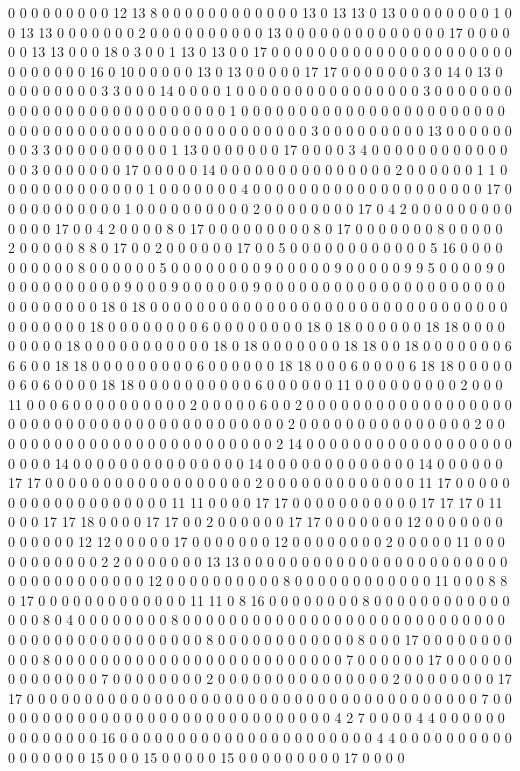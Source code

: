 0 0 0 0 0 0 0 0 0 12 13 8 0 0 0 0 0 0 0 0 0 0 0 0 13 0 13 13 0 13 0 0 0 0 0 0 0 0 1 0 0 13 13 0 0 0 0 0 0 0 2 0 0 0 0 0 0 0 0 0 0 13 0 0 0 0 0 0 0 0 0 0 0 0 0 0 17 0 0 0 0 0 0 13 13 0 0 0 18 0 3 0 0 1 13 0 13 0 0 17 0 0 0 0 0 0 0 0 0 0 0 0 0 0 0 0 0 0 0 0 0 0 0 0 0 0 0 0 16 0 10 0 0 0 0 0 13 0 13 0 0 0 0 0 17 17 0 0 0 0 0 0 0 3 0 14 0 13 0 0 0 0 0 0 0 0 0 3 3 0 0 0 14 0 0 0 0 1 0 0 0 0 0 0 0 0 0 0 0 0 0 0 0 0 3 0 0 0 0 0 0 0 0 0 0 0 0 0 0 0 0 0 0 0 0 0 0 0 0 0 0 1 0 0 0 0 0 0 0 0 0 0 0 0 0 0 0 0 0 0 0 0 0 0 0 0 0 0 0 0 0 0 0 0 0 0 0 0 0 0 0 0 0 0 0 0 0 0 0 0 0 3 0 0 0 0 0 0 0 0 0 13 0 0 0 0 0 0 0 0 3 3 0 0 0 0 0 0 0 0 0 0 1 13 0 0 0 0 0 0 0 17 0 0 0 0 3 4 0 0 0 0 0 0 0 0 0 0 0 0 0 0 3 0 0 0 0 0 0 0 17 0 0 0 0 0 14 0 0 0 0 0 0 0 0 0 0 0 0 0 0 0 2 0 0 0 0 0 0 1 1 0 0 0 0 0 0 0 0 0 0 0 0 0 1 0 0 0 0 0 0 0 4 0 0 0 0 0 0 0 0 0 0 0 0 0 0 0 0 0 0 0 0 17 0 0 0 0 0 0 0 0 0 0 0 1 0 0 0 0 0 0 0 0 0 0 2 0 0 0 0 0 0 0 0 17 0 4 2 0 0 0 0 0 0 0 0 0 0 0 0 0 17 0 0 4 2 0 0 0 0 8 0 17 0 0 0 0 0 0 0 0 0 8 0 17 0 0 0 0 0 0 0 8 0 0 0 0 0 2 0 0 0 0 0 8 8 0 17 0 0 2 0 0 0 0 0 0 17 0 0 5 0 0 0 0 0 0 0 0 0 0 0 0 5 16 0 0 0 0 0 0 0 0 0 0 8 0 0 0 0 0 0 5 0 0 0 0 0 0 0 0 9 0 0 0 0 0 9 0 0 0 0 0 9 9 5 0 0 0 0 9 0 0 0 0 0 0 0 0 0 0 0 9 0 0 0 9 0 0 0 0 0 0 9 0 0 0 0 0 0 0 0 0 0 0 0 0 0 0 0 0 0 0 0 0 0 0 0 0 0 0 0 0 18 0 18 0 0 0 0 0 0 0 0 0 0 0 0 0 0 0 0 0 0 0 0 0 0 0 0 0 0 0 0 0 0 0 0 0 0 0 0 0 0 18 0 0 0 0 0 0 0 0 6 0 0 0 0 0 0 0 0 18 0 18 0 0 0 0 0 0 18 18 0 0 0 0 0 0 0 0 0 18 0 0 0 0 0 0 0 0 0 0 0 18 0 18 0 0 0 0 0 0 0 18 18 0 0 18 0 0 0 0 0 0 0 6 6 6 0 0 18 18 0 0 0 0 0 0 0 0 0 6 0 0 0 0 0 0 18 18 0 0 0 6 0 0 0 0 6 18 18 0 0 0 0 0 0 6 0 6 0 0 0 0 18 18 0 0 0 0 0 0 0 0 0 0 6 0 0 0 0 0 0 11 0 0 0 0 0 0 0 0 0 2 0 0 0 11 0 0 0 6 0 0 0 0 0 0 0 0 0 0 2 0 0 0 0 0 6 0 0 2 0 0 0 0 0 0 0 0 0 0 0 0 0 0 0 0 0 0 0 0 0 0 0 0 0 0 0 0 0 0 0 0 0 0 0 0 0 0 0 0 0 0 2 0 0 0 0 0 0 0 0 0 0 0 0 0 0 0 2 0 0 0 0 0 0 0 0 0 0 0 0 0 0 0 0 0 0 0 0 0 0 0 0 0 2 14 0 0 0 0 0 0 0 0 0 0 0 0 0 0 0 0 0 0 0 0 0 0 14 0 0 0 0 0 0 0 0 0 0 0 0 0 0 0 14 0 0 0 0 0 0 0 0 0 0 0 0 0 14 0 0 0 0 0 0 17 17 0 0 0 0 0 0 0 0 0 0 0 0 0 0 0 0 0 0 2 0 0 0 0 0 0 0 0 0 0 0 0 0 11 17 0 0 0 0 0 0 0 0 0 0 0 0 0 0 0 0 0 0 0 11 11 0 0 0 0 17 17 0 0 0 0 0 0 0 0 0 0 0 17 17 17 0 11 0 0 0 17 17 18 0 0 0 0 17 17 0 0 2 0 0 0 0 0 0 17 17 0 0 0 0 0 0 0 12 0 0 0 0 0 0 0 0 0 0 0 0 0 12 12 0 0 0 0 0 17 0 0 0 0 0 0 0 12 0 0 0 0 0 0 0 0 2 0 0 0 0 0 11 0 0 0 0 0 0 0 0 0 0 0 2 2 0 0 0 0 0 0 0 13 13 0 0 0 0 0 0 0 0 0 0 0 0 0 0 0 0 0 0 0 0 0 0 0 0 0 0 0 0 0 0 0 0 0 0 0 12 0 0 0 0 0 0 0 0 0 0 8 0 0 0 0 0 0 0 0 0 0 0 0 11 0 0 0 8 8 0 17 0 0 0 0 0 0 0 0 0 0 0 0 0 11 11 0 8 16 0 0 0 0 0 0 0 0 8 0 0 0 0 0 0 0 0 0 0 0 0 0 0 0 8 0 4 0 0 0 0 0 0 0 0 8 0 0 0 0 0 0 0 0 0 0 0 0 0 0 0 0 0 0 0 0 0 0 0 0 0 0 0 0 0 0 0 0 0 0 0 0 0 0 0 0 0 0 0 0 0 8 0 0 0 0 0 0 0 0 0 0 0 0 8 0 0 0 17 0 0 0 0 0 0 0 0 0 0 0 8 0 0 0 0 0 0 0 0 0 0 0 0 0 0 0 0 0 0 0 0 0 0 0 0 0 7 0 0 0 0 0 0 17 0 0 0 0 0 0 0 0 0 0 0 0 0 0 7 0 0 0 0 0 0 0 0 2 0 0 0 0 0 0 0 0 0 0 0 0 0 0 0 2 0 0 0 0 0 0 0 0 17 17 0 0 0 0 0 0 0 0 0 0 0 0 0 0 0 0 0 0 0 0 0 0 0 0 0 0 0 0 0 0 0 0 0 0 0 0 0 0 0 7 0 0 0 0 0 0 0 0 0 0 0 0 0 0 0 0 0 0 0 0 0 0 0 0 0 0 0 0 0 0 4 2 7 0 0 0 0 4 4 0 0 0 0 0 0 0 0 0 0 0 0 0 0 16 0 0 0 0 0 0 0 0 0 0 0 0 0 0 0 0 0 0 0 0 0 0 4 4 0 0 0 0 0 0 0 0 0 0 0 0 0 0 0 0 0 15 0 0 0 15 0 0 0 0 0 15 0 0 0 0 0 0 0 0 0 17 0 0 0 0 